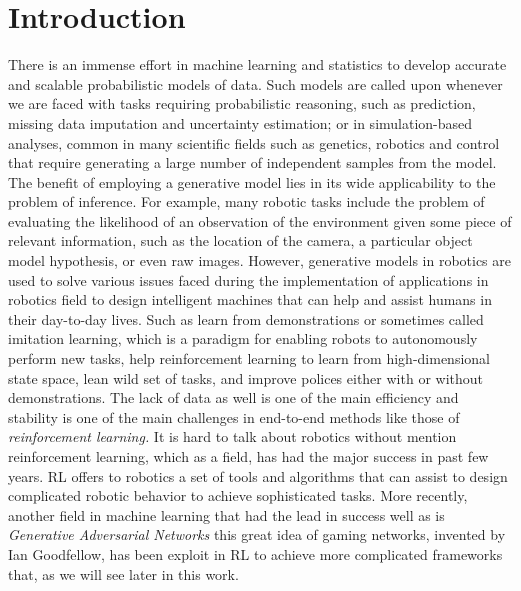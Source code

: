 
\pagestyle{fancy}  
\chapter*{Introduction}
\vspace{5 pt}
There is an immense effort in machine learning and statistics to develop accurate and scalable probabilistic models of data. Such models are called upon whenever we are faced with tasks requiring probabilistic reasoning, such as prediction, missing data imputation and uncertainty estimation; or in simulation-based analyses, common in many scientific fields such as genetics, robotics and control that require generating a large number of independent samples from the model. The benefit of employing a generative model lies in its wide applicability to the problem of inference. For example, many robotic tasks include the problem of evaluating the likelihood of an observation of the environment given some piece of relevant information, such as the location of the camera, a particular object model hypothesis, or even raw images. However, generative models in robotics are used to solve various issues faced during the implementation of applications in robotics field to design intelligent machines that can help and assist humans in their day-to-day lives. Such as learn from demonstrations or sometimes called imitation learning, which is a paradigm for enabling robots to autonomously perform new tasks, help reinforcement learning to learn from high-dimensional state space, lean wild set of tasks, and improve polices either with or without demonstrations. The lack of data as well is one of the main efficiency and stability is one of the main challenges in end-to-end methods like those of\textit{ \textacutedbl reinforcement learning\textgravedbl.} It is hard to talk about robotics without mention reinforcement learning, which as a field, has had the major success in past few years. RL offers to robotics a set of tools and algorithms that can assist to design complicated robotic behavior to achieve sophisticated tasks. More recently, another field in machine learning that had the lead in success well as is\textit{ \textacutedbl Generative Adversarial Networks\textgravedbl} this great idea of gaming networks, invented by Ian Goodfellow, has been exploit in RL to achieve more complicated frameworks that, as we will see later in this work.
